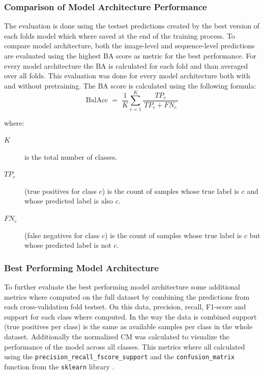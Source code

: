     \subsubsection{Comparison of Model Architecture Performance}
    The evaluation is done using the testset predictions created by the best version of each folds model which where saved at the end of the training process.
    To compare model architecture, both the image-level and sequence-level predictions are evaluated using the highest \ac{BA} score as metric for the best performance.
    For every model architecture the \ac{BA} is calculated for each fold and than averaged over all folds.
    This evaluation was done for every model architecture both with and without pretraining.
    The \ac{BA} score is calculated using the following formula:
    \begin{equation}
    \text{BalAcc}
    \;=\;
    \frac{1}{K} \sum_{c=1}^{K}
        \frac{TP_{c}}{\,TP_{c} + FN_{c}\,}
    \end{equation}

    \noindent where:
    \begin{description}
        \item[\(K\)] is the total number of classes.
        \item[\(TP_{c}\)] (true positives for class \(c\)) is the count of samples whose true label is \(c\) and whose predicted label is also \(c\).
        \item[\(FN_{c}\)] (false negatives for class \(c\)) is the count of samples whose true label is \(c\) but whose predicted label is not \(c\).
    \end{description}

    \subsubsection{Best Performing Model Architecture}
    To further evaluate the best performing model architecture some additional metrics where computed on the full dataset by combining the predictions from each cross-validation fold testset.
    On this data, precision, recall, F1-score and support for each class where computed.
    In the way the data is combined support (true positives per class) is the same as available samples per class in the whole dataset.
    Additionally the normalized \ac{CM} was calculated to visualize the performance of the model across all classes.
    This metrics where all calculated using the \texttt{precision\_recall\_fscore\_support} and the \texttt{confusion\_matrix} function from the \texttt{sklearn} library \autocite{pedregosaScikitlearnMachineLearning2011}.

